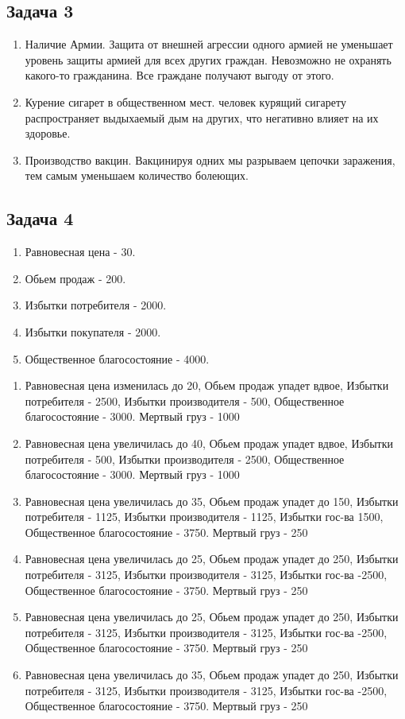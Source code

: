 \documentclass[a4paper,12pt]{article}
\begin{document}
\subsection{Задача 3}
\begin{enumerate}
    \item Наличие Армии. Защита от внешней агрессии одного армией не уменьшает уровень защиты армией для всех других граждан. Невозможно не охранять какого-то гражданина. Все граждане получают выгоду от этого.
    \item Курение сигарет в общественном мест. человек курящий сигарету распространяет выдыхаемый дым на других, что негативно влияет на их здоровье.
    \item Производство вакцин. Вакцинируя одних мы разрываем цепочки заражения, тем самым уменьшаем количество болеющих.
\end{enumerate}

\subsection{Задача 4}
\begin{enumerate}
    \item Равновесная цена - 30. 
    \item Обьем продаж - 200.
    \item Избытки потребителя - 2000. 
    \item Избытки покупателя - 2000. 
    \item Общественное благосостояние - 4000. 
\end{enumerate}

\begin{enumerate}
    \item Равновесная цена изменилась до 20, Обьем продаж упадет вдвое, Избытки потребителя - 2500, Избытки производителя - 500, Общественное благосостояние - 3000. Мертвый груз - 1000
    \item Равновесная цена увеличилась до 40, Обьем продаж упадет вдвое, Избытки потребителя - 500, Избытки производителя - 2500, Общественное благосостояние - 3000. Мертвый груз - 1000
    \item Равновесная цена увеличилась до 35, Обьем продаж упадет до 150, Избытки потребителя - 1125, Избытки производителя - 1125, Избытки гос-ва 1500, Общественное благосостояние - 3750. Мертвый груз - 250
    \item Равновесная цена увеличилась до 25, Обьем продаж упадет до 250, Избытки потребителя - 3125, Избытки производителя - 3125, Избытки гос-ва -2500, Общественное благосостояние - 3750. Мертвый груз - 250
    \item Равновесная цена увеличилась до 25, Обьем продаж упадет до 250, Избытки потребителя - 3125, Избытки производителя - 3125, Избытки гос-ва -2500, Общественное благосостояние - 3750. Мертвый груз - 250
    \item Равновесная цена увеличилась до 35, Обьем продаж упадет до 250, Избытки потребителя - 3125, Избытки производителя - 3125, Избытки гос-ва -2500, Общественное благосостояние - 3750. Мертвый груз - 250
\end{enumerate}
\end{document}
